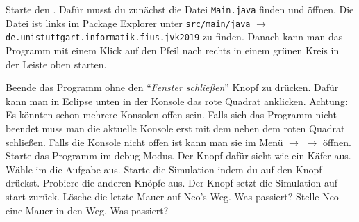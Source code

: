 Starte den \simulator.
 Dafür musst du zunächst die Datei \texttt{Main.java} finden und öffnen.
 Die Datei ist links im Package Explorer unter \texttt{src/main/java} $\to$ \texttt{de.unistuttgart.informatik.fius.jvk2019} zu finden.
 Danach kann man das Programm mit einem Klick auf den Pfeil nach rechts in einem grünen Kreis in der Leiste oben starten.

 
     \subexcercise Beende das Programm ohne den "`\textit{Fenster schließen}"' Knopf zu drücken.
         Dafür kann man in Eclipse unten in der Konsole das rote Quadrat anklicken.
         Achtung: Es könnten schon mehrere Konsolen offen sein.
         Falls sich das Programm nicht beendet muss man die aktuelle Konsole erst mit dem  neben dem roten Quadrat schließen.
         Falls die Konsole nicht offen ist kann man sie im Menü  $\to$  $\to$  öffnen.
     \subexcercise Starte das Programm im debug Modus.
         Der Knopf dafür sieht wie ein Käfer aus.
     \subexcercise Wähle im \simulator{} die Aufgabe  aus.
         Starte die Simulation indem du auf den  Knopf drückst.
         Probiere die anderen Knöpfe aus.
         Der  Knopf setzt die Simulation auf start zurück.
     \subexcercise Lösche die letzte Mauer auf Neo's Weg.
         Was passiert?
     \subexcercise Stelle Neo eine Mauer in den Weg.
         Was passiert?
 
